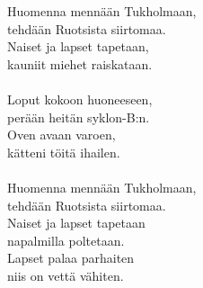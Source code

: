 
            Huomenna mennään Tukholmaan, \\
            tehdään Ruotsista siirtomaa. \\
            Naiset ja lapset tapetaan, \\
            kauniit miehet raiskataan. \\
\hspace{10mm} \\
            Loput kokoon huoneeseen, \\
            perään heitän syklon-B:n. \\
            Oven avaan varoen, \\
            kätteni töitä ihailen. \\
\hspace{10mm} \\
            Huomenna mennään Tukholmaan, \\
            tehdään Ruotsista siirtomaa. \\
            Naiset ja lapset tapetaan \\
            napalmilla poltetaan. \\
            Lapset palaa parhaiten \\
            niis on vettä vähiten. \\
